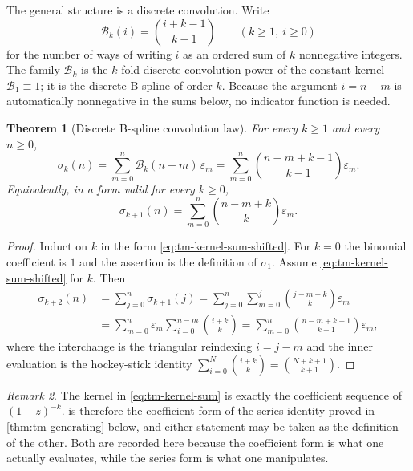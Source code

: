 \documentclass[11pt,oneside]{article}
\newtheorem{theorem}{Theorem}[section]
\theoremstyle{definition}
\theoremstyle{remark}
\newtheorem{remark}[theorem]{Remark}
\begin{document}
The general structure is a discrete convolution.  Write
\begin{equation}
 \mathcal B_k(i)=\binom{i+k-1}{k-1}\qquad(k\ge1,\ i\ge0)   \label{eq:tm-kernel}
\end{equation}
for the number of ways of writing $i$ as an ordered sum of $k$ nonnegative integers.  The
family $\mathcal B_k$ is the $k$-fold discrete convolution power of the constant kernel
$\mathcal B_1\equiv1$; it is the discrete B-spline of order $k$.  Because the argument
$i=n-m$ is automatically nonnegative in the sums below, no indicator function is needed.

\begin{theorem}[Discrete B-spline convolution law]
\label{thm:tm-convolution}
For every $k\ge1$ and every $n\ge0$,
\begin{equation}
 \sigma_k(n)=\sum_{m=0}^{n}\mathcal B_k(n-m)\,\varepsilon_m
 =\sum_{m=0}^{n}\binom{n-m+k-1}{k-1}\varepsilon_m.         \label{eq:tm-kernel-sum}
\end{equation}
Equivalently, in a form valid for every $k\ge0$,
\begin{equation}
 \sigma_{k+1}(n)=\sum_{m=0}^{n}\binom{n-m+k}{k}\varepsilon_m. \label{eq:tm-kernel-sum-shifted}
\end{equation}
\end{theorem}

\begin{proof}
Induct on $k$ in the form \eqref{eq:tm-kernel-sum-shifted}.  For $k=0$ the binomial
coefficient is $1$ and the assertion is the definition of $\sigma_1$.  Assume
\eqref{eq:tm-kernel-sum-shifted} for $k$.  Then
\begin{align*}
 \sigma_{k+2}(n)
 &=\sum_{j=0}^{n}\sigma_{k+1}(j)
  =\sum_{j=0}^{n}\sum_{m=0}^{j}\binom{j-m+k}{k}\varepsilon_m\\
 &=\sum_{m=0}^{n}\varepsilon_m\sum_{i=0}^{n-m}\binom{i+k}{k}
  =\sum_{m=0}^{n}\binom{n-m+k+1}{k+1}\varepsilon_m,
\end{align*}
where the interchange is the triangular reindexing $i=j-m$ and the inner evaluation is the
hockey-stick identity $\sum_{i=0}^{N}\binom{i+k}{k}=\binom{N+k+1}{k+1}$.
\end{proof}

\begin{remark}
The kernel in \eqref{eq:tm-kernel-sum} is exactly the coefficient sequence of
$(1-z)^{-k}$.   is therefore the coefficient form of the series
identity proved in \cref{thm:tm-generating} below, and either statement may be taken as the
definition of the other.  Both are recorded here because the coefficient form is what one
actually evaluates, while the series form is what one manipulates.
\end{remark}
\end{document}
